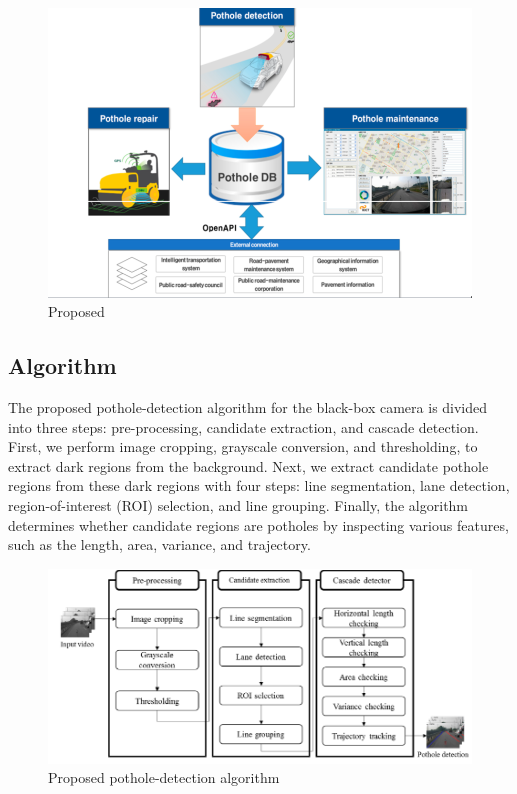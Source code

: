 \documentclass[12pt]{report}
\begin{document}
\begin{figure}[H]\includegraphics[scale=0.7]{blackbox.png}\centering\caption{Proposed\cite{Jo}} \label{fig:Proposed pothole-maintenance system} \end{figure}%

\subsection{Algorithm}
The proposed pothole-detection algorithm for the black-box camera is divided into three steps: pre-processing, candidate extraction, and cascade detection. First, we perform image cropping, grayscale conversion, and thresholding, to extract dark regions from the background. Next, we extract candidate pothole regions from these dark regions with four steps: line segmentation, lane detection, region-of-interest (ROI) selection, and line grouping. Finally, the algorithm determines whether candidate regions are potholes by inspecting various features, such as the length, area, variance, and trajectory.

\begin{figure}[H]\includegraphics[scale=0.7]{black.png}\centering\caption{Proposed pothole-detection algorithm\cite{Jo}} \label{fig:Proposed pothole-detection algorithm} \end{figure}%
\end{document}
